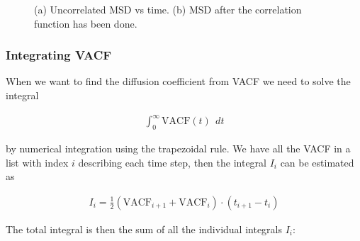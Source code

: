 \documentclass{article}
\begin{document}
\begin{figure}[htb]
	\centering
  \caption{
    (a) Uncorrelated MSD vs time.
    (b) MSD after the correlation function has been done.
  }
\end{figure}
\subsubsection{Integrating VACF}

When we want to find the diffusion coefficient from VACF we need
to solve the integral

\begin{align}
    \int_0^\infty \mathrm{VACF}(t) \ \ dt
\end{align}

by numerical integration using the trapezoidal rule.
We have all the VACF in a list with index $i$ describing each time step, then the integral $I_i$
can be estimated as

\begin{align}
    I_i = \frac{1}{2}(\mathrm{VACF}_{i+1} 
    + \mathrm{VACF}_i) \cdot (t_{i+1} - t_i)
\end{align}

The total integral is then the sum of all the individual integrals $I_i$:
\end{document}
